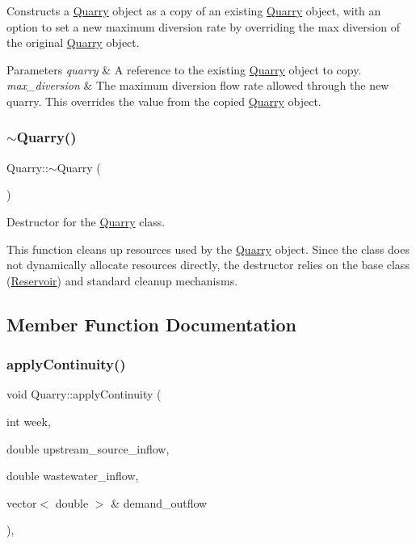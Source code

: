 Constructs a \mbox{\hyperlink{classQuarry}{Quarry}} object as a copy of an existing \mbox{\hyperlink{classQuarry}{Quarry}} object, with an option to set a new maximum diversion rate by overriding the max diversion of the original \mbox{\hyperlink{classQuarry}{Quarry}} object. 


\begin{DoxyParams}{Parameters}
{\em quarry} & A reference to the existing \mbox{\hyperlink{classQuarry}{Quarry}} object to copy. \\
\hline
{\em max\+\_\+diversion} & The maximum diversion flow rate allowed through the new quarry. This overrides the value from the copied \mbox{\hyperlink{classQuarry}{Quarry}} object. \\
\hline
\end{DoxyParams}
\mbox{\label{classQuarry_a6c528c6222e8e5adc134db5cafbe62e3}} 
\subsubsection{\texorpdfstring{$\sim$\+Quarry()}{~Quarry()}}
{\footnotesize\ttfamily Quarry\+::$\sim$\+Quarry (\begin{DoxyParamCaption}{ }\end{DoxyParamCaption})}



Destructor for the \mbox{\hyperlink{classQuarry}{Quarry}} class. 

This function cleans up resources used by the \mbox{\hyperlink{classQuarry}{Quarry}} object. Since the class does not dynamically allocate resources directly, the destructor relies on the base class ({\ttfamily \mbox{\hyperlink{classReservoir}{Reservoir}}}) and standard cleanup mechanisms. 

\subsection{Member Function Documentation}
\mbox{\label{classQuarry_a6999b854a740ce92baaa610cf5b08bd9}} 
\subsubsection{\texorpdfstring{apply\+Continuity()}{applyContinuity()}}
{\footnotesize\ttfamily void Quarry\+::apply\+Continuity (\begin{DoxyParamCaption}\item[{int}]{week,  }\item[{double}]{upstream\+\_\+source\+\_\+inflow,  }\item[{double}]{wastewater\+\_\+inflow,  }\item[{vector$<$ double $>$ \&}]{demand\+\_\+outflow }\end{DoxyParamCaption})\hspace{0.3cm}{\ttfamily [override]}, {\ttfamily [virtual]}}



